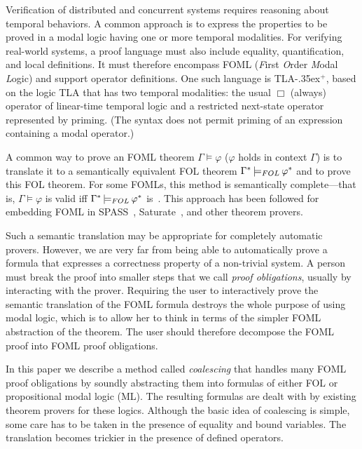 \documentclass{easychair}
\newcommand{\tlaplus}{\mbox{TLA\kern -.35ex$^+$}\xspace}
\newcommand{\FOL}[1]{\ensuremath{#1_{\textit{\scriptsize FOL}}}}
\newcommand{\folmodels}{\mathop{\models_{\textit{\scriptsize FOL}}}}
\newcommand{\edmargin}[2]{\marginpar{\raggedright\footnotesize\color{red}#1: #2}}
\newcommand{\edmargin}[2]{}
\def\llmargin{\edmargin{LL}}
\def\smmargin{\edmargin{SM}}
\begin{document}
Verification of distributed and concurrent systems requires reasoning
about temporal behaviors.  A common approach is to express the
properties to be proved in a modal logic having one or more temporal
modalities.  For verifying real-world systems, a proof language must
also include equality, quantification, and local definitions.  It must
therefore encompass FOML (\emph{F}irst \emph{O}rder \emph{M}odal
\emph{L}ogic) and support operator definitions.  One such language is
\tlaplus \cite{lamport:tla+}, based on the logic TLA
that has two temporal modalities: the
usual $\Box$ (always) operator of linear-time temporal logic and a
restricted next-state operator represented by priming.  (The syntax
does not permit priming of an expression containing a modal operator.)

A common way to prove an FOML theorem
%
%
$\Gamma\models\varphi$ ($\varphi$ holds in context $\Gamma$)
is to translate it to a semantically equivalent FOL theorem
$\Gamma^* \folmodels \varphi^*$
%
%
and to prove this FOL theorem.  For some FOMLs, this method is
semantically complete---that is, $\Gamma\models\varphi$ is valid iff
$\Gamma^* \folmodels \varphi^*$ is~\cite{ohlbach:translation}.
%
This approach has been followed for embedding FOML in
SPASS~\cite{hustadt:mspass}, Saturate~\cite{ganzinger:saturate}, and other theorem
provers.

Such a semantic translation may be appropriate for completely
automatic provers.  However, we are very far from being able to
automatically prove a formula that expresses a correctness property of
a non-trivial system.  A person must break the proof into smaller
steps that we call \emph{proof obligations}, usually by interacting
with the prover.  Requiring the user to interactively prove the
semantic translation of the FOML formula destroys the whole purpose of
using modal logic, which is to allow her to think in terms of the
simpler FOML abstraction of the theorem.  The user should therefore
decompose the FOML proof into FOML proof obligations.

In this paper we describe a method called \emph{coalescing} that handles many
FOML proof obligations by soundly abstracting them into formulas of either FOL
or propositional modal logic (ML). The resulting formulas are dealt with by
existing theorem provers for these logics. Although the basic idea of coalescing
is simple, some care has to be taken in the presence of equality and bound
variables. The translation becomes trickier in the presence of defined
operators.
\end{document}
